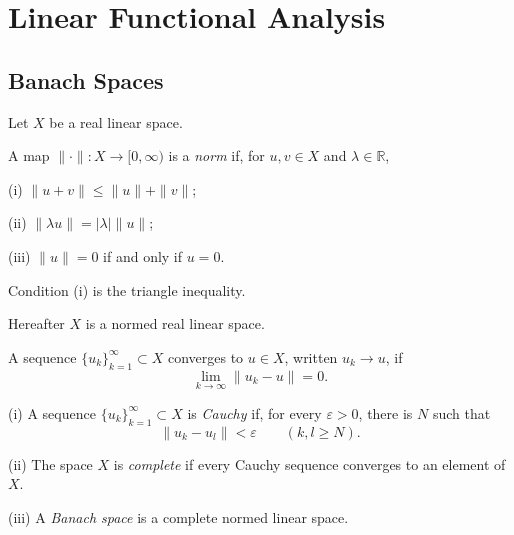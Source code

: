 
\section{Linear Functional Analysis}
\label{sec:linear-functional-analysis}

\subsection{Banach Spaces}
\label{sec:banach-spaces}

Let $X$ be a real linear space.

\begin{definition}[Norm]
\label{def:norm-normed-linear-space}
A map $\|\cdot\|:X\to[0,\infty)$ is a \textit{norm} if, for $u,v\in X$ and $\lambda\in\mathbb R$,

(i) $\|u+v\|\leq\|u\|+\|v\|$;

(ii) $\|\lambda u\|=|\lambda|\|u\|$;

(iii) $\|u\|=0$ if and only if $u=0$.

Condition (i) is the triangle inequality.
\end{definition}

Hereafter $X$ is a normed real linear space.

\begin{definition}
\label{def:convergence-normed-space}
A sequence $\{u_k\}_{k=1}^\infty\subset X$ converges to $u\in X$, written $u_k\to u$, if
\[
\lim_{k\to\infty}\|u_k-u\|=0.
\]
\end{definition}

\begin{definition}
\label{def:cauchy-sequence-complete-banach-space}
(i) A sequence $\{u_k\}_{k=1}^\infty\subset X$ is \textit{Cauchy} if, for every $\varepsilon>0$, there is $N$ such that
\[
\|u_k-u_l\|<\varepsilon\qquad(k,l\geq N).
\]

(ii) The space $X$ is \textit{complete} if every Cauchy sequence converges to an element of $X$.

(iii) A \textit{Banach space} is a complete normed linear space.
\end{definition}

